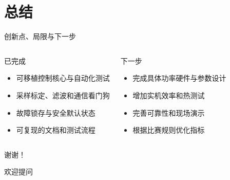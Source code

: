 \documentclass[aspectratio=169,10pt,fontset=fandol]{ctexbeamer}
\begin{document}
\section{总结}
\begin{frame}{创新点、局限与下一步}
  \begin{columns}[T]
    \begin{block}{已完成}
      \begin{itemize}
        \item 可移植控制核心与自动化测试
        \item 采样标定、滤波和通信看门狗
        \item 故障锁存与安全默认状态
        \item 可复现的文档和测试流程
      \end{itemize}
    \end{block}
    \begin{block}{下一步}
      \begin{itemize}
        \item 完成具体功率硬件与参数设计
        \item 增加实机效率和热测试
        \item 完善可靠性和现场演示
        \item 根据比赛规则优化指标
      \end{itemize}
    \end{block}
  \end{columns}
\end{frame}

\begin{frame}
  \centering
  {\Huge 谢谢！\par}
  \vspace{1cm}
  {\Large 欢迎提问\par}
\end{frame}
\end{document}
